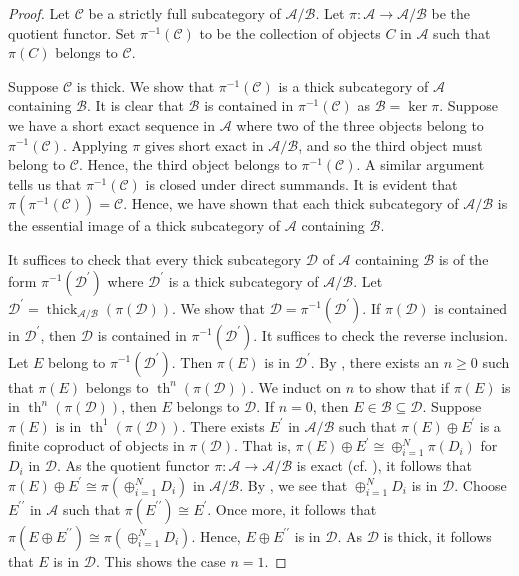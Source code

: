 \documentclass[11pt]{amsart}
\theoremstyle{plain}
\theoremstyle{definition}
\numberwithin{equation}{section}
\numberwithin{theorem}{section}
\begin{document}
\begin{proof}
    Let $\mathcal{C}$ be a strictly full subcategory of $\mathcal{A}/\mathcal{B}$. Let $\pi \colon \mathcal{A} \to \mathcal{A}/\mathcal{B}$ be the quotient functor. Set $\pi^{-1}(\mathcal{C})$ to be the collection of objects $C$ in $\mathcal{A}$ such that $\pi(C)$ belongs to $\mathcal{C}$.
         
    Suppose $\mathcal{C}$ is thick. We show that $\pi^{-1}(\mathcal{C})$ is a thick subcategory of $\mathcal{A}$ containing $\mathcal{B}$. It is clear that $\mathcal{B}$ is contained in $\pi^{-1}(\mathcal{C})$ as $\mathcal{B}=\ker \pi$. Suppose we have a short exact sequence in $\mathcal{A}$ where two of the three objects belong to $\pi^{-1}(\mathcal{C})$. Applying $\pi$ gives short exact in $\mathcal{A}/\mathcal{B}$, and so the third object must belong to $\mathcal{C}$. Hence, the third object belongs to $\pi^{-1}(\mathcal{C})$. A similar argument tells us that $\pi^{-1}(\mathcal{C})$ is closed under direct summands. It is evident that $\pi(\pi^{-1}(\mathcal{C}))=\mathcal{C}$. Hence, we have shown that each thick subcategory of $\mathcal{A}/\mathcal{B}$ is the essential image of a thick subcategory of $\mathcal{A}$ containing $\mathcal{B}$. 
        
    It suffices to check that every thick subcategory $\mathcal{D}$ of $\mathcal{A}$ containing $\mathcal{B}$ is of the form $\pi^{-1}(\mathcal{D}^\prime)$ where $\mathcal{D}^\prime$ is a thick subcategory of $\mathcal{A}/\mathcal{B}$. Let $\mathcal{D}^\prime= \operatorname{thick}_{\mathcal{A}/\mathcal{B}}(\pi(\mathcal{D}))$. We show that $\mathcal{D} = \pi^{-1} (\mathcal{D}^\prime)$. If $\pi(\mathcal{D})$ is contained in $\mathcal{D}^\prime$, then $\mathcal{D}$ is contained in $\pi^{-1}(\mathcal{D}^\prime)$. It suffices to check the reverse inclusion. Let $E$ belong to $\pi^{-1}(\mathcal{D}^\prime)$. Then $\pi(E)$ is in $ \mathcal{D}^\prime$. By , there exists an $n\geq 0$ such that $\pi(E)$ belongs to $\operatorname{th}^n (\pi(\mathcal{D}))$. We induct on $n$ to show that if $\pi (E)$ is in $\operatorname{th}^n (\pi(\mathcal{D}))$, then $E$ belongs to $\mathcal{D}$. If $n=0$, then $E\in\mathcal{B}\subseteq \mathcal{D}$. Suppose $\pi(E)$ is in $\operatorname{th}^1 (\pi(\mathcal{D}))$. There exists $E^\prime$ in $\mathcal{A}/\mathcal{B}$ such that $\pi(E)\oplus E^\prime$ is a finite coproduct of objects in $\pi(\mathcal{D})$. That is, $\pi(E) \oplus E^\prime \cong \oplus^N_{i=1}\pi(D_i)$ for $D_i$ in $\mathcal{D}$. As the quotient functor $\pi \colon \mathcal{A} \to \mathcal{A}/\mathcal{B}$ is exact (cf. \cite[$\S 3.1$ Proposition 1]{Gabriel:1962}), it follows that $\pi(E) \oplus E^\prime \cong \pi(\oplus^N_{i=1} D_i)$ in $\mathcal{A}/\mathcal{B}$. By , we see that $\oplus^N_{i=1} D_i$ is in $\mathcal{D}$. Choose $E^{\prime \prime}$ in $\mathcal{A}$ such that $\pi(E^{\prime \prime})\cong E^\prime$. Once more, it follows that $\pi(E\oplus E^{\prime \prime})\cong \pi (\oplus^N_{i=1} D_i)$. Hence, $E\oplus E^{\prime \prime}$ is in $\mathcal{D}$. As $\mathcal{D}$ is thick, it follows that $E$ is in $\mathcal{D}$. This shows the case $n=1$. 
    

\end{proof}
\end{document}
